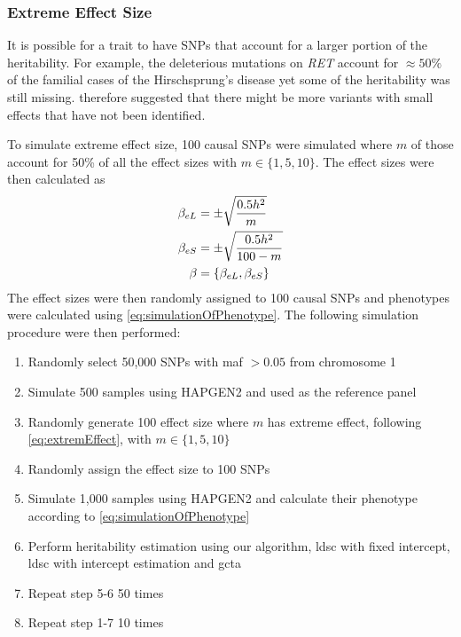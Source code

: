 		\subsubsection{Extreme Effect Size}
		\label{sec:extremeEffectSim}
		It is possible for a trait to have \glspl{SNP} that account for a larger portion of the heritability.
		For example, the deleterious mutations on \textit{RET} account for $\approx50\%$ of the familial cases of the Hirschsprung's disease yet some of the heritability was still missing.
		\citet{Gui2013} therefore suggested that there might be more variants with small effects that have not been identified.
		
		To simulate extreme effect size, 100 causal \glspl{SNP} were simulated where $m$ of those account for 50\% of all the effect sizes with $m\in\{1,5,10\}$.
		The effect sizes were then calculated as
		\begin{align}
		\beta_{eL} &= \pm\sqrt{\frac{0.5h^2}{m}} \notag\\
		\beta_{eS} &= \pm\sqrt{\frac{0.5h^2}{100-m}} \notag\\
		\beta &= \{\beta_{eL}, \beta_{eS}\}
		\label{eq:extremEffect}
		\end{align}
		The effect sizes were then randomly assigned to 100 causal \glspl{SNP} and phenotypes were calculated using \cref{eq:simulationOfPhenotype}.
		The following simulation procedure were then performed:
		\begin{enumerate}
			\item Randomly select 50,000 \glspl{SNP} with \gls{maf} $>0.05$ from chromosome 1
			\item Simulate 500 samples using HAPGEN2 and used as the reference panel
			\item Randomly generate 100 effect size where $m$ has extreme effect, following \cref{eq:extremEffect}, with $m\in\{1,5,10\}$
			\item Randomly assign the effect size to 100 \glspl{SNP}
			\item Simulate 1,000 samples using HAPGEN2 and calculate their phenotype according to \cref{eq:simulationOfPhenotype}
			\item Perform heritability estimation using our algorithm, \gls{ldsc} with fixed intercept, \gls{ldsc} with intercept estimation and \gls{gcta}
			\item Repeat step 5-6 50 times
			\item Repeat step 1-7 10 times
		\end{enumerate}
		
